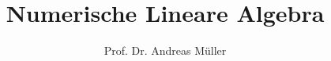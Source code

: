 %
%
%


\beamertemplatenavigationsymbolsempty
\title[NLinAlg]{Numerische Lineare Algebra}
\author[A.~Müller]{Prof. Dr. Andreas Müller}
\date[]{}

